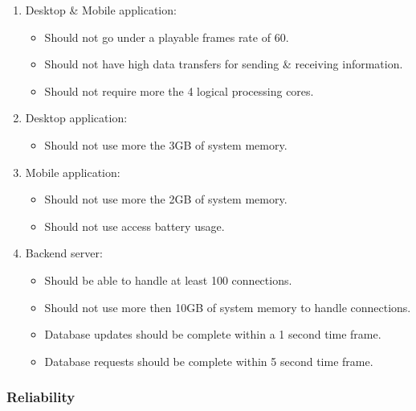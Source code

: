 \documentclass[letterpaper]{article}
\begin{document}
			\begin{enumerate}
				\item Desktop \& Mobile application:
					\begin{itemize}
						\item Should not go under a playable frames rate of 60.
						\item Should not have high data transfers for sending \& receiving information.
						\item Should not require more the 4 logical processing cores.
					\end{itemize}
			
				\item Desktop application:
					\begin{itemize}
						\item Should not use more the 3GB of system memory.
					\end{itemize}
			
				\item Mobile application:
					\begin{itemize}
						\item Should not use more the 2GB of system memory.
						\item Should not use access battery usage.
					\end{itemize}
					
				\item Backend server:
					\begin{itemize}
						\item Should be able to handle at least 100 connections.
						\item Should not use more then 10GB of system memory to handle connections.
						\item Database updates should be complete within a 1 second time frame.
						\item Database requests should be complete within 5 second time frame.
					\end{itemize}
			\end{enumerate}
			
			\subsubsection*{Reliability}
			\vspace{0.1in}
			
\end{document}
